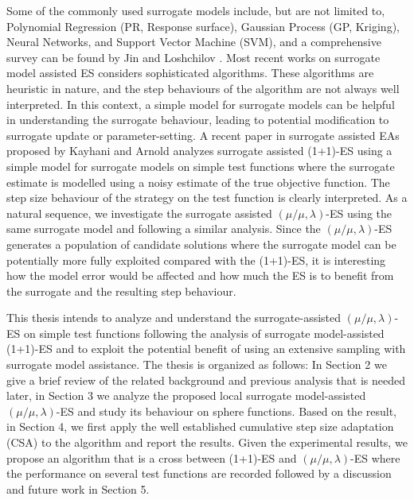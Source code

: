 Some of the commonly used surrogate models include, but are not limited to, Polynomial Regression (PR, Response surface), Gaussian Process (GP, Kriging), Neural Networks, and Support Vector Machine (SVM), and a comprehensive survey can be found by Jin \cite{JIN201161} and Loshchilov \cite{ECJ2016_LMCMA}. Most recent works on surrogate model assisted ES considers sophisticated algorithms. These algorithms are heuristic in nature, and the step behaviours of the algorithm are not always well interpreted. In this context, a simple model for surrogate models can be helpful in understanding the surrogate behaviour, leading to potential modification to surrogate update or parameter-setting. A recent paper in surrogate assisted EAs proposed by Kayhani and Arnold \cite{DBLP:conf/ppsn/KayhaniA18} analyzes surrogate assisted (1+1)-ES using a simple model for surrogate models on simple test functions where the surrogate estimate is modelled using a noisy estimate of the true objective function. The step size behaviour of the strategy on the test function is clearly interpreted. As a natural sequence, we investigate the surrogate assisted $(\mu/\mu,\lambda)$-ES using the same surrogate model and following a similar analysis. Since the $(\mu/\mu,\lambda)$-ES generates a population of candidate solutions where the surrogate model can be potentially more fully exploited compared with the (1+1)-ES, it is interesting how the model error would be affected and how much the ES is to benefit from the surrogate and the resulting step behaviour.

This thesis intends to analyze and understand the surrogate-assisted $(\mu/\mu,\lambda)$-ES on simple test functions following the analysis of surrogate model-assisted (1+1)-ES \cite{DBLP:conf/ppsn/KayhaniA18} and to exploit the potential benefit of using an extensive sampling with surrogate model assistance. The thesis is organized as follows: In Section 2 we give a brief review of the related background and previous analysis that is needed later, in Section 3 we analyze the proposed local surrogate model-assisted $(\mu/\mu,\lambda)$-ES and study its behaviour on sphere functions. Based on the result, in Section 4, we first apply the well established cumulative step size adaptation (CSA) to the algorithm and report the results. Given the experimental results, we propose an algorithm that is a cross between (1+1)-ES and $(\mu/\mu,\lambda)$-ES where the performance on several test functions are recorded followed by a discussion and future work in Section 5. 


